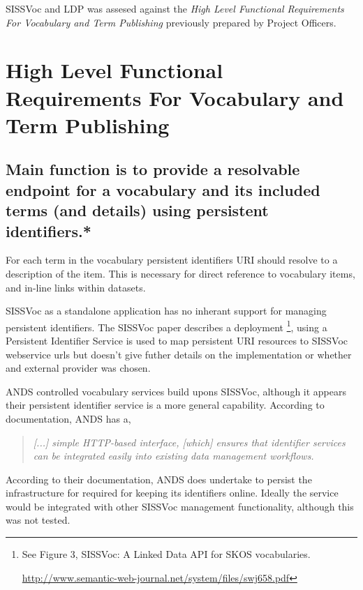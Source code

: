 \documentclass[10pt,a4paper]{article}
\newenvironment{italicquotes}
{\begin{quote}\itshape}
{\end{quote}}
\begin{document}
\begin{flushleft}
    \item[] SISSVoc and LDP was assesed against the \textit{High Level Functional
  Requirements For Vocabulary and Term Publishing} previously prepared by Project
  Officers.
    

\clearpage


\section { 
	High Level Functional Requirements For Vocabulary and Term Publishing
}

  \subsection{
   Main function is to provide a resolvable endpoint for a vocabulary and its
  included terms (and details) using persistent identifiers.* 
  }

  \item For each term in the vocabulary persistent identifiers {URI} should
  resolve to a description of the item. This is necessary for direct reference to
  vocabulary items, and in-line links within datasets.

  \item SISSVoc as a standalone application has no inherant support for managing persistent
  identifiers. The SISSVoc paper describes a deployment \footnote{ See Figure 3,
  SISSVoc: A Linked Data API for SKOS vocabularies.

  \url{http://www.semantic-web-journal.net/system/files/swj658.pdf} }, using a
  Persistent Identifier Service is used to map persistent URI resources to SISSVoc
  webservice urls but doesn't give futher details on the implementation or
  whether and external provider was chosen. 

  \item ANDS controlled vocabulary services build upons SISSVoc, although it appears
  their persistent identifier service is a more general capability. According to
  documentation, ANDS has a, 

  \begin{italicquotes} [...] simple HTTP-based interface, [which] ensures that
  identifier services can be integrated easily into existing data management
  workflows.  \end{italicquotes}
  According to their documentation, ANDS does undertake to persist the infrastructure for required for
  keeping its identifiers online. Ideally the service would be integrated
  with other SISSVoc management functionality, although this was not tested.


\end{flushleft}
\end{document}

